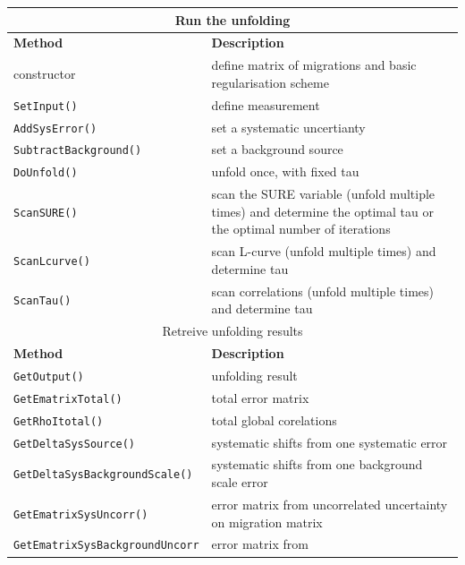 \documentclass[12pt]{article}
\begin{document}
\begin{table}[ht]
\centering
\begin{tabular}{l|p{}}
\hline
\multicolumn{2}{c}{Run the unfolding} \\
\hline
{\bf Method} & {\bf Description} \\
\hline
constructor & define matrix of migrations and basic regularisation scheme
 \\
{\tt SetInput()} & define measurement
 \\
{\tt AddSysError()} & set a systematic uncertianty
 \\
{\tt SubtractBackground()} & set a background source
 \\
{\tt DoUnfold()} & unfold once, with fixed tau
 \\
{\tt ScanSURE()} & scan the SURE variable (unfold multiple times) and
determine the optimal tau or the optimal number of iterations 
 \\
{\tt ScanLcurve()} & scan L-curve (unfold multiple times) and determine tau
 \\
{\tt ScanTau()} & scan correlations (unfold multiple times) and determine tau
 \\
\hline
\hline
\multicolumn{2}{c}{Retreive unfolding results}
 \\
\hline
{\bf Method} & {\bf Description}
 \\
\hline
{\tt GetOutput()} & unfolding result
 \\
{\tt GetEmatrixTotal()} & total error matrix
 \\
{\tt GetRhoItotal()} & total global corelations
 \\
{\tt GetDeltaSysSource()} & systematic shifts from one systematic error
 \\
{\tt GetDeltaSysBackgroundScale()} & systematic shifts from one background
scale error
 \\
{\tt GetEmatrixSysUncorr()} & error matrix from 
uncorrelated uncertainty on migration matrix
 \\
{\tt GetEmatrixSysBackgroundUncorr} & error matrix from 

\end{tabular}
\end{table}
\end{document}
